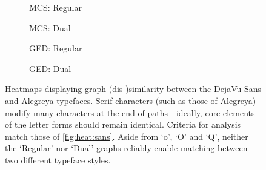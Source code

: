 \documentclass{mpaper}
\begin{document}
\begin{figure}
	\centering
	\begin{subfigure}[b]{0.225\linewidth}
		
		\caption{MCS: Regular\label{fig:heat:vs:mcs-r}}
	\end{subfigure}
	\begin{subfigure}[b]{0.225\linewidth}
		
		\caption{MCS: Dual\label{fig:heat:vs:mcs-d}}
	\end{subfigure}
	\begin{subfigure}[b]{0.225\linewidth}
		
		\caption{GED: Regular\label{fig:heat:vs:ged-r}}
	\end{subfigure}
	\begin{subfigure}[b]{0.225\linewidth}
		
		\caption{GED: Dual\label{fig:heat:vs:ged-d}}
	\end{subfigure}
	
	\vspace{0.5em}
	\caption{
		Heatmaps displaying graph (dis-)similarity between the DejaVu Sans and Alegreya typefaces.
		Serif characters (such as those of Alegreya) modify many characters at the end of paths---ideally, core elements of the letter forms should remain identical.
		Criteria for analysis match those of \cref{fig:heat:sans}.
		Aside from `o', `O' and `Q', neither the `Regular' nor `Dual' graphs reliably enable matching between two different typeface styles.
		\label{fig:heat:vs}
	}
\end{figure}


%

\end{document}
